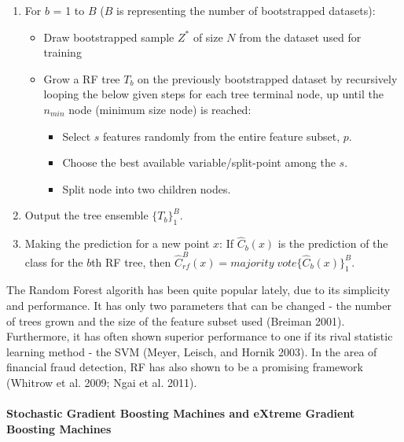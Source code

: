 \documentclass[12pt,]{article}
\providecommand{\tightlist}{%
  \setlength{\itemsep}{0pt}\setlength{\parskip}{0pt}}
\let\oldparagraph\paragraph
\renewcommand{\paragraph}[1]{\oldparagraph{#1}\mbox{}}
\begin{document}
\begin{enumerate}
\def\labelenumi{\arabic{enumi}.}
\tightlist
\item
  For \(b\) = 1 to \(B\) (\(B\) is representing the number of
  bootstrapped datasets):

  \begin{itemize}
  \tightlist
  \item
    Draw bootstrapped sample \(Z^*\) of size \(N\) from the dataset used
    for training
  \item
    Grow a RF tree \(T_b\) on the previously bootstrapped dataset by
    recursively looping the below given steps for each tree terminal
    node, up until the \(n_{min}\) node (minimum size node) is reached:

    \begin{itemize}
    \tightlist
    \item
      Select \(s\) features randomly from the entire feature subset,
      \(p\).
    \item
      Choose the best available variable/split-point among the \(s\).
    \item
      Split node into two children nodes.
    \end{itemize}
  \end{itemize}
\item
  Output the tree ensemble \(\{T_b\}^{B}_{1}\).
\item
  Making the prediction for a new point \(x\): If \(\widehat{C}_b(x)\)
  is the prediction of the class for the \(b\)th RF tree, then
  \(\widehat{C}_{rf}^{B}(x)=majority\;vote\{\widehat{C}_b(x)\}_{1}^{B}\).
\end{enumerate}

The Random Forest algorith has been quite popular lately, due to its
simplicity and performance. It has only two parameters that can be
changed - the number of trees grown and the size of the feature subset
used (Breiman 2001). Furthermore, it has often shown superior
performance to one if its rival statistic learning method - the SVM
(Meyer, Leisch, and Hornik 2003). In the area of financial fraud
detection, RF has also shown to be a promising framework (Whitrow et al.
2009; Ngai et al. 2011).

\hypertarget{stochastic-gradient-boosting-machines-and-extreme-gradient-boosting-machines}{%
\paragraph{Stochastic Gradient Boosting Machines and eXtreme Gradient
Boosting
Machines}\label{stochastic-gradient-boosting-machines-and-extreme-gradient-boosting-machines}}
\end{document}
